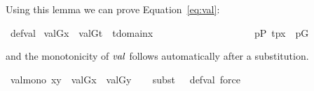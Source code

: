 Using this lemma we can prove Equation~\eqref{eq:val}:
\begin{isabelle}
  \isamarkupfalse%
  \ def{\isacharunderscore}val{\isacharcolon}\isanewline
  \ {\isachardoublequoteopen}val{\isacharparenleft}G{\isacharcomma}x{\isacharparenright}\ {\isacharequal}\ {\isacharbraceleft}val{\isacharparenleft}G{\isacharcomma}t{\isacharparenright}\ {\isachardot}{\isachardot}\ t{\isasymin}domain{\isacharparenleft}x{\isacharparenright}\ {\isacharcomma}\isanewline
\ \ \ \ \ \ \ \ \ \ \ \ \ \ \ \ \ \ \ {\isasymexists}p{\isasymin}P{\isachardot}\ {\isacharless}t{\isacharcomma}p{\isachargreater}{\isasymin}x\ {\isasymand}\ p{\isasymin}G\ {\isacharbraceright}{\isachardoublequoteclose}
\end{isabelle}
and the monotonicity of $\operatorname{\mathit{val}}$ follows automatically after a
substitution.
\begin{isabelle}
\isamarkupfalse%
\ val{\isacharunderscore}mono{\isacharcolon}\ {\isachardoublequoteopen}x{\isasymsubseteq}y\ {\isasymLongrightarrow}\ val{\isacharparenleft}G{\isacharcomma}x{\isacharparenright}\ {\isasymsubseteq}\ val{\isacharparenleft}G{\isacharcomma}y{\isacharparenright}{\isachardoublequoteclose}\isanewline
%
\ \ \isamarkupfalse%
\ {\isacharparenleft}subst\ {\isacharparenleft}{}\ {}{\isacharparenright}\ def{\isacharunderscore}val{\isacharcomma}\ force{\isacharparenright}%
\end{isabelle}


